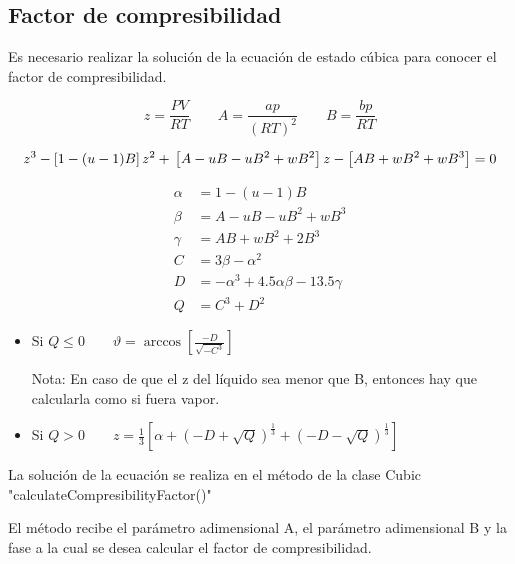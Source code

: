 \subsection{Factor de compresibilidad}

Es necesario realizar la solución de la ecuación de estado cúbica para conocer el factor de compresibilidad.

\begin{equation}
z= \frac{P V}{R T}
\qquad
A=\frac{ap}{(RT)^2}
\qquad
B=\frac{bp}{RT}
\end{equation}

\begin{equation}
z^3-\left[1-(u-1)B\right]z^2+ \\ \left[A-uB-uB^2 +\\ wB^2\right]z-\left[AB+wB^2+wB^3\right]=0
\end{equation}


\begin{align}
\alpha &= 1-(u-1)B\\
\beta &= A -uB-uB^2+wB^3\\
\gamma &= AB +wB^2+ 2B^3\\
C &= 3\beta - \alpha^2\\
D&= - \alpha^3+ 4.5 \alpha \beta -13.5 \gamma\\
Q&=C^3+D^2
\end{align}


\begin{itemize}
\item Si $Q \leq 0 \qquad \vartheta = \arccos \left[\frac{-D}{\sqrt{-C^3}}\right]$
Nota: En caso de que el z del líquido sea menor que B, entonces hay que calcularla como si fuera vapor.
\item Si $Q > 0 \qquad z = \frac{1}{3}\left[\alpha + \left(-D + \sqrt{Q}\right)^{\frac{1}{3}}+ \left(-D - \sqrt{Q}\right)^{\frac{1}{3}} \right]$
\end{itemize}

La solución de la ecuación se realiza en el método de la clase Cubic "calculateCompresibilityFactor()"

El método recibe el parámetro adimensional A, el parámetro adimensional B y la fase a la cual se desea calcular el factor de compresibilidad.

